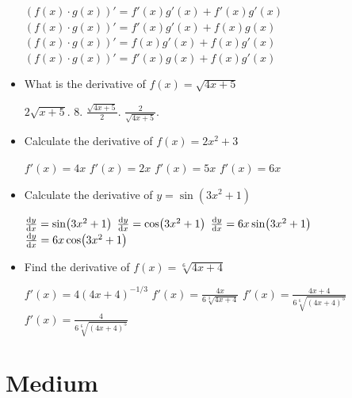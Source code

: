 \documentclass{exam}
\begin{document}
\begin{itemize}
	\begin{choices}
		\choice $(f(x)\cdot g(x))' = f'(x)g'(x)+f'(x)g'(x)$
		\choice $(f(x)\cdot g(x))' = f'(x)g'(x)+f(x)g(x)$
		\choice $(f(x)\cdot g(x))' = f(x)g'(x)+f(x)g'(x)$
		\CorrectChoice $(f(x)\cdot g(x))' = f'(x)g(x) + f(x)g'(x)$
	\end{choices}

	\item What is the derivative of $f(x) = \sqrt{4x+5}$

	\begin{choices}
		\choice $2\sqrt{x+5}$.
		\choice $8$.
		\choice $\frac{\sqrt{4x+5}}{2}$.
		\CorrectChoice $\frac{2}{\sqrt{4x+5}}$.
	\end{choices}
	\item Calculate the derivative of $f(x) = 2x^2+3$

	\begin{choices}
		\CorrectChoice $f'(x) = 4x$
		\choice $f'(x) = 2x$
		\choice $f'(x) = 5x$
		\choice $f'(x) = 6x$
	\end{choices}
	\item Calculate the derivative  of $y=\sin(3x{^2}+1)$

	\begin{choices}
		\choice $\dv{y}{x} = \sin(3x{^2}+1)$
		\choice $\dv{y}{x} = \cos(3x{^2}+1)$
        \choice $\dv{y}{x} = 6x\sin(3x{^2}+1)$
		\CorrectChoice $\dv{y}{x} = 6x \cos(3x{^2}+1)$
	\end{choices}
	\item Find the derivative of $f(x) = \sqrt[6]{4x+4}$

	\begin{choices}
		\choice $f'(x) = 4 (4x+4)^{-1/3} $
		\choice $f'(x) = \frac{4x }{6 \sqrt[3]{4x+4}}$
		\choice $f'(x) = \frac{4 x + 4}{6 \sqrt[6]{(4x + 4)^{5}}} $
		\CorrectChoice $f'(x) = \frac{4}{6 \sqrt[6]{(4x + 4)^{5}}}$
	\end{choices}

\end{itemize}




\section{Medium}
\end{document}
